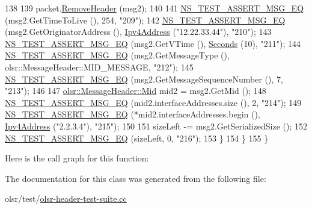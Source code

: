 \begin{DoxyCode}
138 
139       packet.\hyperlink{classns3_1_1Packet_a0961eccf975d75f902d40956c93ba63e}{RemoveHeader} (msg2);
140 
141       \hyperlink{group__testing_ga2a9d78cffb3db8e867c35fff0b698cf5}{NS\_TEST\_ASSERT\_MSG\_EQ} (msg2.GetTimeToLive (),  254, \textcolor{stringliteral}{"209"});
142       \hyperlink{group__testing_ga2a9d78cffb3db8e867c35fff0b698cf5}{NS\_TEST\_ASSERT\_MSG\_EQ} (msg2.GetOriginatorAddress (), 
      \hyperlink{classns3_1_1Ipv4Address}{Ipv4Address} (\textcolor{stringliteral}{"12.22.33.44"}), \textcolor{stringliteral}{"210"});
143       \hyperlink{group__testing_ga2a9d78cffb3db8e867c35fff0b698cf5}{NS\_TEST\_ASSERT\_MSG\_EQ} (msg2.GetVTime (), \hyperlink{group__timecivil_ga33c34b816f8ff6628e33d5c8e9713b9e}{Seconds} (10), \textcolor{stringliteral}{"211"});
144       \hyperlink{group__testing_ga2a9d78cffb3db8e867c35fff0b698cf5}{NS\_TEST\_ASSERT\_MSG\_EQ} (msg2.GetMessageType (), olsr::MessageHeader::MID\_MESSAGE,
       \textcolor{stringliteral}{"212"});
145       \hyperlink{group__testing_ga2a9d78cffb3db8e867c35fff0b698cf5}{NS\_TEST\_ASSERT\_MSG\_EQ} (msg2.GetMessageSequenceNumber (), 7, \textcolor{stringliteral}{"213"});
146 
147       \hyperlink{structns3_1_1olsr_1_1MessageHeader_1_1Mid}{olsr::MessageHeader::Mid} mid2 = msg2.GetMid ();
148       \hyperlink{group__testing_ga2a9d78cffb3db8e867c35fff0b698cf5}{NS\_TEST\_ASSERT\_MSG\_EQ} (mid2.interfaceAddresses.size (), 2, \textcolor{stringliteral}{"214"});
149       \hyperlink{group__testing_ga2a9d78cffb3db8e867c35fff0b698cf5}{NS\_TEST\_ASSERT\_MSG\_EQ} (*mid2.interfaceAddresses.begin (), 
      \hyperlink{classns3_1_1Ipv4Address}{Ipv4Address} (\textcolor{stringliteral}{"2.2.3.4"}), \textcolor{stringliteral}{"215"});
150 
151       sizeLeft -= msg2.GetSerializedSize ();
152       \hyperlink{group__testing_ga2a9d78cffb3db8e867c35fff0b698cf5}{NS\_TEST\_ASSERT\_MSG\_EQ} (sizeLeft, 0, \textcolor{stringliteral}{"216"});
153     \}
154   \}
155 \}
\end{DoxyCode}


Here is the call graph for this function\+:




The documentation for this class was generated from the following file\+:\begin{DoxyCompactItemize}
\item 
olsr/test/\hyperlink{olsr-header-test-suite_8cc}{olsr-\/header-\/test-\/suite.\+cc}\end{DoxyCompactItemize}
